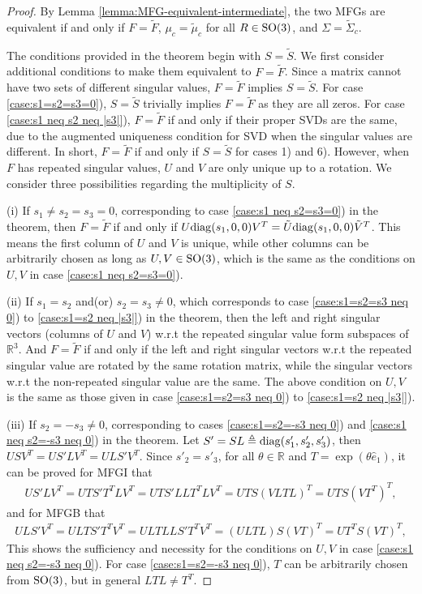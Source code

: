 \begin{proof}
	By Lemma \ref{lemma:MFG-equivalent-intermediate}, the two MFGs are equivalent if and only if $F=\tilde{F}$, $\mu_c=\tilde{\mu}_c$ for all $R\in\mathrm{SO}(3)$, and $\Sigma=\tilde{\Sigma}_c$.
	
	The conditions provided in the theorem begin with $S=\tilde {S}$. 
	We first consider additional conditions to make them equivalent to $F=\tilde{F}$.
	Since a matrix cannot have two sets of different singular values, $F=\tilde{F}$ implies $S=\tilde{S}$.
	For case \ref{case:s1=s2=s3=0}), $S=\tilde{S}$ trivially implies $F=\tilde {F}$ as they are all zeros.
	For case \ref{case:s1 neq s2 neq |s3|}), $F=\tilde{F}$ if and only if their proper SVDs are the same, due to the augmented uniqueness condition for SVD when the singular values are different.
	In short, $F=\tilde{F}$ if and only if $S=\tilde{S}$ for cases 1) and 6).
	However, when $F$ has repeated singular values, $U$ and $V$ are only unique up to a rotation.
	We consider three possibilities regarding the multiplicity of $S$.
	
	(i) If $s_1 \neq s_2=s_3=0$, corresponding to case \ref{case:s1 neq s2=s3=0}) in the theorem, then $F=\tilde{F}$ if and only if $U\mathrm{diag}(s_1,0,0)V^T = \tilde{U}\mathrm{diag}(s_1,0,0)\tilde{V}^T$.
	This means the first column of $U$ and $V$ is unique, while other columns can be arbitrarily chosen as long as $U,V\in\mathrm{SO}(3)$, which is the same as the conditions on $U,V$ in case \ref{case:s1 neq s2=s3=0}).
	
	(ii) If $s_1=s_2$ and(or) $s_2=s_3 \neq 0$, which corresponds to case \ref{case:s1=s2=s3 neq 0}) to \ref{case:s1=s2 neq |s3|}) in the theorem, then the left and right singular vectors (columns of $U$ and $V$) w.r.t the repeated singular value form subspaces of $\mathbb{R}^3$.
	And $F=\tilde{F}$ if and only if the left and right singular vectors w.r.t the repeated singular value are rotated by the same rotation matrix, while the singular vectors w.r.t the non-repeated singular value are the same.
	The above condition on $U,V$ is the same as those given in case \ref{case:s1=s2=s3 neq 0}) to \ref{case:s1=s2 neq |s3|}).
	
	(iii) If $s_2=-s_3 \neq 0$, corresponding to cases \ref{case:s1=s2=-s3 neq 0}) and \ref{case:s1 neq s2=-s3 neq 0}) in the theorem.
	Let $S' = SL \triangleq \mathrm{diag}(s'_1,s'_2,s'_3)$, then $USV^T = US'LV^T = ULS'V^T$.
	Since $s'_2=s'_3$, for all $\theta\in\mathbb{R}$ and $T=\exp(\theta\hat{e}_1)$, it can be proved for MFGI that
	\begin{align*}
		US'LV^T = UTS'T^TLV^T = UTS'LLT^TLV^T = UTS(VLTL)^T = UTS(VT^T)^T,
	\end{align*}
	and for MFGB that
	\begin{align*}
		ULS'V^T = ULTS'T^TV^T = ULTLLS'T^TV^T = (ULTL)S(VT)^T = UT^TS(VT)^T,
	\end{align*}
	This shows the sufficiency and necessity for the conditions on $U,V$ in case \ref{case:s1 neq s2=-s3 neq 0}).
	For case \ref{case:s1=s2=-s3 neq 0}), $T$ can be arbitrarily chosen from $\mathrm{SO}(3)$, but in general $LTL \neq T^T$.
	

\end{proof}
